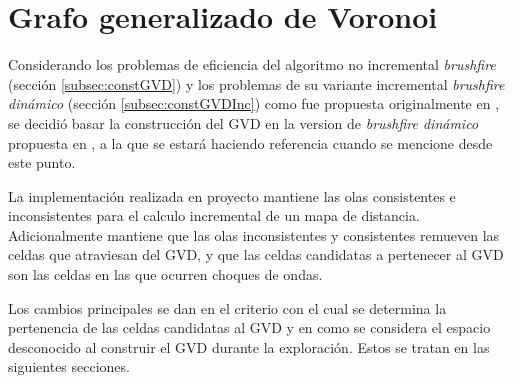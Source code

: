 





\section{Grafo generalizado de Voronoi}\label{sec:MiConstGVD}

Considerando los problemas de eficiencia del algoritmo no incremental \emph{brushfire} (sección
\ref{subsec:constGVD}) y los problemas de su variante incremental
\emph{brushfire dinámico} (sección \ref{subsec:constGVDInc}) como fue propuesta
originalmente en \cite{kalra2009incremental}, se decidió basar la construcción
del GVD en la version de \emph{brushfire dinámico} propuesta en \cite{Lau2013},
a la que se estará haciendo referencia cuando se mencione  desde este punto.


La implementación realizada en proyecto mantiene las olas consistentes e
inconsistentes para el calculo incremental de un mapa de distancia.
Adicionalmente mantiene que las olas inconsistentes y consistentes remueven las
celdas que atraviesan del GVD, y que las celdas candidatas a pertenecer al GVD
son las celdas en las que ocurren choques de ondas.

Los cambios principales se dan en el criterio con el cual se determina la
pertenencia de las celdas candidatas al GVD y en como se considera el espacio
desconocido al construir el GVD durante la exploración. Estos se tratan en las
siguientes secciones.

